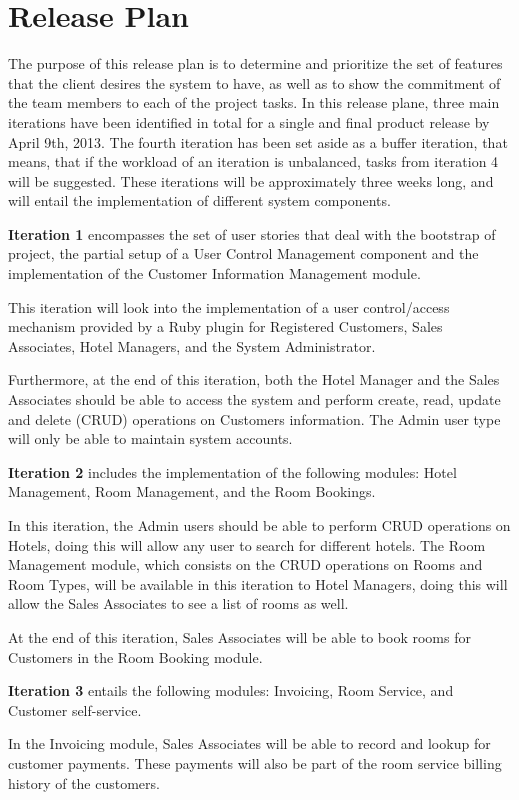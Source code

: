 \section{Release Plan}
The purpose of this release plan is to determine and prioritize the set of features that the client desires the system to have, as well as to show the commitment of the team members to each of the project tasks. In this release plane, three main iterations have been identified in total for a single and final product release by April 9th, 2013. The fourth iteration has been set aside as a buffer iteration, that means, that if the workload of an iteration is unbalanced, tasks from iteration 4 will be suggested. These iterations will be approximately three weeks long, and will entail the implementation of different system components. 

\textbf{Iteration 1} encompasses the set of user stories that deal with the bootstrap of project, the partial setup of a User Control Management component and the implementation of the Customer Information Management module. 

This iteration will look into the implementation of a user control/access mechanism provided by a Ruby plugin for Registered Customers, Sales Associates, Hotel Managers, and the System Administrator. 

Furthermore, at the end of this iteration, both the Hotel Manager and the Sales Associates should be able to access the system and perform create, read, update and delete (CRUD) operations on Customers information. The Admin user type will only be able to maintain system accounts. 

\textbf{Iteration 2} includes the implementation of the following modules: Hotel Management, Room Management, and the Room Bookings.

In this iteration, the Admin users should be able to perform CRUD operations on Hotels, doing this will allow any user to search for different hotels. The Room Management module, which consists on the CRUD operations on Rooms and Room Types, will be available in this iteration to Hotel Managers, doing this will allow the Sales Associates to see a list of rooms as well.

At the end of this iteration, Sales Associates will be able to book rooms for Customers in the Room Booking module.

\textbf{Iteration 3} entails the following modules: Invoicing, Room Service, and Customer self-service. 

In the Invoicing module, Sales Associates will be able to record and lookup for customer payments. These payments will also be part of the room service billing history of the customers.

